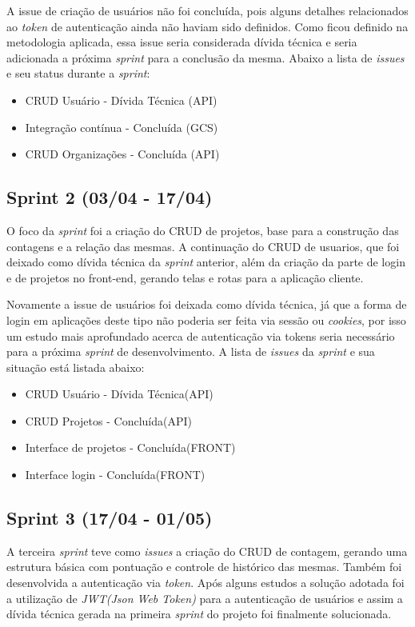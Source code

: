 A issue de criação de usuários não foi concluída, pois alguns detalhes relacionados ao \textit{token} de autenticação ainda não haviam sido definidos. Como ficou definido na metodologia aplicada, essa issue seria considerada dívida técnica e seria adicionada a próxima \textit{sprint} para a conclusão da mesma. Abaixo a lista de \textit{issues} e seu status durante a \textit{sprint}:

\begin{itemize}
  \item CRUD Usuário - Dívida Técnica (API)
  \item Integração contínua - Concluída (GCS)
  \item CRUD Organizações - Concluída (API)
\end{itemize}

\subsection{Sprint 2 (03/04 - 17/04)}

O foco da \textit{sprint} foi a criação do CRUD de projetos, base para a construção das contagens e a relação das mesmas. A continuação do CRUD de usuarios, que foi deixado como dívida técnica da \textit{sprint} anterior, além da criação da parte de login e de projetos no front-end, gerando telas e rotas para a aplicação cliente.

Novamente a issue de usuários foi deixada como dívida técnica, já que a forma de login em aplicações deste tipo não poderia ser feita via sessão ou \textit{cookies}, por isso um estudo mais aprofundado acerca de autenticação via tokens seria necessário para a próxima \textit{sprint} de desenvolvimento. A lista de \textit{issues} da \textit{sprint} e sua situação está listada abaixo:

\begin{itemize}
  \item CRUD Usuário - Dívida Técnica(API)
  \item CRUD Projetos - Concluída(API)
  \item Interface de projetos - Concluída(FRONT)
  \item Interface login - Concluída(FRONT)
\end{itemize}

\subsection{Sprint 3 (17/04 - 01/05)}

A terceira \textit{sprint} teve como \textit{issues} a criação do CRUD de contagem, gerando uma estrutura básica com pontuação e controle de histórico das mesmas. Também foi desenvolvida a autenticação via \textit{token}. Após alguns estudos a solução adotada foi a utilização de \textit{JWT(Json Web Token)} para a autenticação de usuários e assim a dívida técnica gerada na primeira \textit{sprint} do projeto foi finalmente solucionada.

